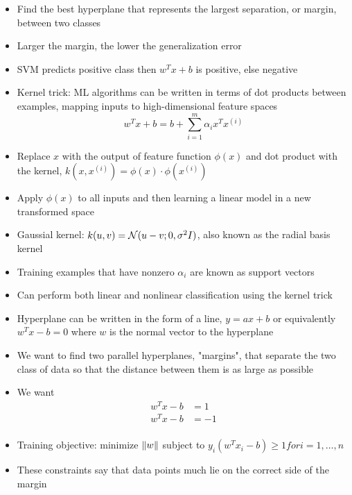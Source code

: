 \documentclass[../main.tex]{subfiles}
\begin{document}
\begin{itemize}
\begin{figure}[h]
\begin{subfigure}{.5\textwidth}
          \label{fig:svm_hyperplane}
        \end{subfigure}
      \end{figure}
    \item Find the best hyperplane that represents the largest separation, or margin, between two classes
    \item Larger the margin, the lower the generalization error
    \item SVM predicts positive class then $w^{T}x+b$ is positive, else negative
    \item Kernel trick: ML algorithms can be written in terms of dot products between examples, mapping inputs to high-dimensional feature spaces
    \begin{equation*}
      w^{T}x + b = b + \sum_{i = 1}^{m} \alpha_{i}x^{T}x^{(i)}
    \end{equation*}
    \item Replace $x$ with the output of feature function $\phi(x)$ and dot product with the kernel, $k(x, x^{(i)}) = \phi(x)\cdot \phi(x^{(i)})$
    \item Apply $\phi(x)$ to all inputs and then learning a linear model in a new transformed space
    \item Gaussial kernel: $k(u,v) = \mathcal{N}(u-v;0, \sigma^{2}I)$, also known as the radial basis kernel
    \item Training examples that have nonzero $\alpha_{i}$ are known as support vectors
    \item Can perform both linear and nonlinear classification using the kernel trick
    \item Hyperplane can be written in the form of a line, $y=ax+b$ or equivalently $w^{T}x - b = 0$ where $w$ is the normal vector to the hyperplane
    \item We want to find two parallel hyperplanes, "margins", that separate the two class of data so that the distance between them is as large as possible
    \item We want
    \begin{align*}
      w^{T}x - b &= 1 \\
      w^{T}x - b &= -1 \\
    \end{align*}
    \item Training objective: minimize $\left\|w\right\|$ subject to $y_{i}(w^{T}x_{i} - b) \geq 1 for i = 1, \dotsc, n$
    \item These constraints say that data points much lie on the correct side of the margin
  \end{itemize}
\end{document}
